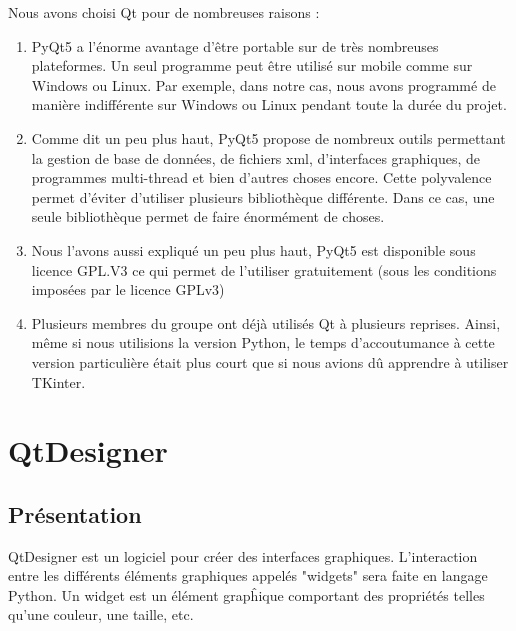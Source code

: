 Nous avons choisi Qt pour de nombreuses raisons :
\begin{enumerate}
    \item \textcolor{red}{}\newline PyQt5 a l'énorme avantage d'être portable sur de très nombreuses plateformes. Un seul programme peut être utilisé sur mobile comme sur Windows ou Linux.\newline
    Par exemple, dans notre cas, nous avons programmé de manière indifférente sur Windows ou Linux pendant toute la durée du projet.
    
    \item \textcolor{red}{}\newline Comme dit un peu plus haut, PyQt5 propose de nombreux outils permettant la gestion de base de données, de fichiers xml, d'interfaces graphiques, de programmes multi-thread et bien d'autres choses encore. Cette polyvalence permet d'éviter d'utiliser plusieurs bibliothèque différente. Dans ce cas, une seule bibliothèque permet de faire énormément de choses.
    
    \item \textcolor{red}{}\newline Nous l'avons aussi expliqué un peu plus haut, PyQt5 est disponible sous licence GPL.V3 ce qui permet de l'utiliser gratuitement (sous les conditions imposées par le licence GPLv3)
    
    \item \textcolor{red}{}\newline Plusieurs membres du groupe ont déjà utilisés Qt à plusieurs reprises. Ainsi, même si nous utilisions la version Python, le temps d'accoutumance à cette version particulière était plus court que si nous avions dû apprendre à utiliser TKinter.
\end{enumerate}

\section{QtDesigner}

\subsection{Présentation}
QtDesigner est un logiciel pour créer des interfaces graphiques.\newline
L'interaction entre les différents éléments graphiques appelés "widgets" sera faite en langage Python. 
Un widget est un élément grapĥique comportant des propriétés telles qu'une couleur, une taille, etc. \newline \newline


